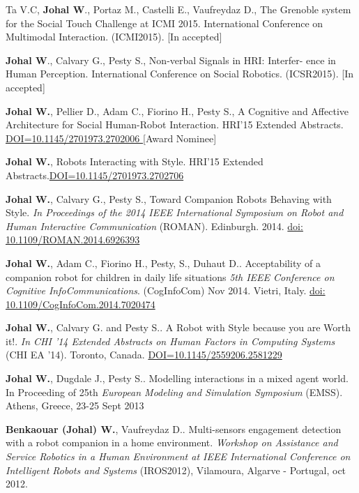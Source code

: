 \documentclass[10pt]{article}
\begin{document}
\begin{bibenum}
	
\item Ta V.C, \textbf{Johal W}., Portaz M., Castelli E., Vaufreydaz D., The Grenoble system for the Social Touch Challenge at ICMI 2015. International Conference on Multimodal Interaction. (ICMI2015). [In accepted] 
	
	
\item  \textbf{Johal W}., Calvary G., Pesty S., Non-verbal Signals in HRI: Interfer- ence in Human Perception. International Conference on Social Robotics. (ICSR2015). [In accepted] 
	
	
\item  \textbf{Johal W.}, Pellier D., Adam C., Fiorino H., Pesty S., A Cognitive and Affective Architecture for Social Human-Robot Interaction. HRI'15 Extended Abstracts. \href{http://doi.acm.org/10.1145/2701973.2702006}{DOI=10.1145/2701973.2702006 }  [Award Nominee]	

\item  \textbf{Johal W.}, Robots Interacting with Style. HRI'15 Extended Abstracts.\href{http://doi.acm.org/10.1145/2701973.2702706}{DOI=10.1145/2701973.2702706}   

\item \textbf{Johal W.}, Calvary G., Pesty S., Toward Companion Robots Behaving with Style. \emph{In Proceedings of the 2014 IEEE International Symposium on Robot and Human Interactive Communication} (ROMAN). Edinburgh. 2014. \href{ http://ieeexplore.ieee.org/stamp/stamp.jsp?tp=&arnumber=6926393&isnumber=6926219}{doi: 10.1109/ROMAN.2014.6926393}

\item \textbf{Johal W.}, Adam C., Fiorino H., Pesty, S., Duhaut D.. Acceptability of a companion
robot for children in daily life
situations \emph{5th IEEE Conference on Cognitive InfoCommunications}. (CogInfoCom) Nov 2014. Vietri, Italy. \href{http://ieeexplore.ieee.org/stamp/stamp.jsp?tp=&arnumber=7020474&isnumber=7020399}{doi: 10.1109/CogInfoCom.2014.7020474}


\item \textbf{Johal W.}, Calvary G. and  Pesty S.. A Robot with Style because you are Worth it!.  \emph{In CHI '14 Extended Abstracts on Human Factors in Computing Systems} (CHI EA '14). Toronto, Canada. \href{http://doi.acm.org/10.1145/2559206.2581229}{DOI=10.1145/2559206.2581229}

\item \textbf{Johal W.}, Dugdale J.,  Pesty S.. Modelling interactions in a mixed agent world. In Proceeding of 25th \emph{European Modeling and Simulation Symposium} (EMSS). Athens, Greece, 23-25 Sept 2013

\item  \textbf{Benkaouar (Johal) W.}, Vaufreydaz D.. Multi-sensors engagement detection with a robot companion in a home environment. \emph{Workshop on Assistance and Service Robotics in a Human Environment at IEEE International Conference on Intelligent Robots and Systems} (IROS2012), Vilamoura, Algarve - Portugal, oct 2012.

  

\end{bibenum}
\end{document}
